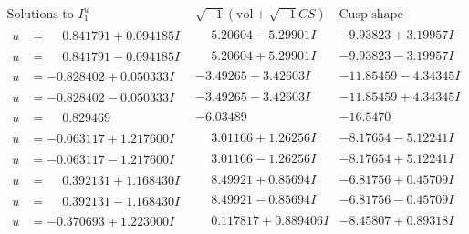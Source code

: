 \documentclass[1p]{elsarticle_modified}
\theoremstyle{definition}
\newcommand{\I}{\sqrt{-1}}
\begin{document}
$$\begin{array}{c|c|c}  
\text{Solutions to }I^u_{1}& \I (\text{vol} + \sqrt{-1}CS) & \text{Cusp shape}\\
 \hline 
\begin{aligned}
u &= \phantom{-}0.841791 + 0.094185 I\end{aligned}
 & \phantom{-}5.20604 - 5.29901 I & -9.93823 + 3.19957 I \\ \hline\begin{aligned}
u &= \phantom{-}0.841791 - 0.094185 I\end{aligned}
 & \phantom{-}5.20604 + 5.29901 I & -9.93823 - 3.19957 I \\ \hline\begin{aligned}
u &= -0.828402 + 0.050333 I\end{aligned}
 & -3.49265 + 3.42603 I & -11.85459 - 4.34345 I \\ \hline\begin{aligned}
u &= -0.828402 - 0.050333 I\end{aligned}
 & -3.49265 - 3.42603 I & -11.85459 + 4.34345 I \\ \hline\begin{aligned}
u &= \phantom{-}0.829469\phantom{ +0.000000I}\end{aligned}
 & -6.03489\phantom{ +0.000000I} & -16.5470\phantom{ +0.000000I} \\ \hline\begin{aligned}
u &= -0.063117 + 1.217600 I\end{aligned}
 & \phantom{-}3.01166 + 1.26256 I & -8.17654 - 5.12241 I \\ \hline\begin{aligned}
u &= -0.063117 - 1.217600 I\end{aligned}
 & \phantom{-}3.01166 - 1.26256 I & -8.17654 + 5.12241 I \\ \hline\begin{aligned}
u &= \phantom{-}0.392131 + 1.168430 I\end{aligned}
 & \phantom{-}8.49921 + 0.85694 I & -6.81756 + 0.45709 I \\ \hline\begin{aligned}
u &= \phantom{-}0.392131 - 1.168430 I\end{aligned}
 & \phantom{-}8.49921 - 0.85694 I & -6.81756 - 0.45709 I \\ \hline\begin{aligned}
u &= -0.370693 + 1.223000 I\end{aligned}
 & \phantom{-}0.117817 + 0.889406 I & -8.45807 + 0.89318 I \\ \hline\begin{aligned}

\end{aligned}
\end{array}$$
\end{document}
